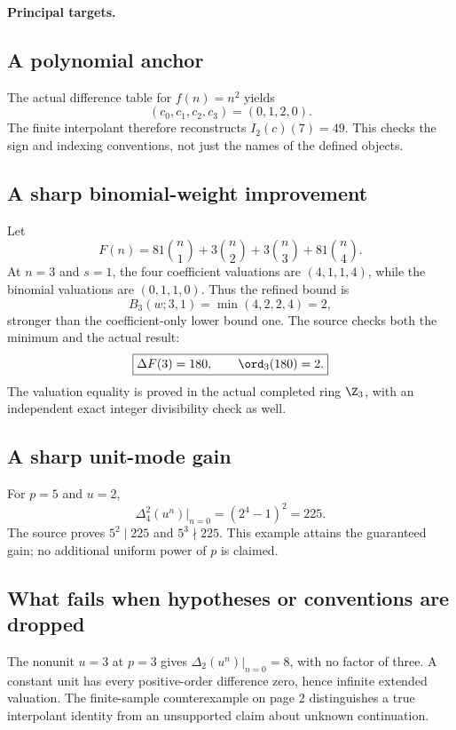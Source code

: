 \textbf{Principal targets.}\par
{}\par
{}\par
{}
\par\medskip
{}
\subsection*{A polynomial anchor}
The actual difference table for $f(n)=n^2$ yields
\[
 (c_0,c_1,c_2,c_3)=(0,1,2,0).
\]
The finite interpolant therefore reconstructs $I_2(c)(7)=49$. This checks the sign and indexing conventions, not just the names of the defined objects.

\subsection*{A sharp binomial-weight improvement}
Let
\[
 F(n)=81\binom n1+3\binom n2+3\binom n3+81\binom n4.
\]
At $n=3$ and $s=1$, the four coefficient valuations are $(4,1,1,4)$, while the binomial valuations are $(0,1,1,0)$. Thus the refined bound is
\[
 B_3(w;3,1)=\min(4,2,2,4)=2,
\]
stronger than the coefficient-only lower bound one. The source checks both the minimum and the actual result:
\[
 \boxed{\Delta F(3)=180,\qquad\ord_3(180)=2.}
\]
The valuation equality is proved in the actual completed ring $\Z_3$, with an independent exact integer divisibility check as well.

\subsection*{A sharp unit-mode gain}
For $p=5$ and $u=2$,
\[
 \Delta_4^2(u^n)\big|_{n=0}=(2^4-1)^2=225.
\]
The source proves $5^2\mid225$ and $5^3\nmid225$. This example attains the guaranteed gain; no additional uniform power of $p$ is claimed.

\subsection*{What fails when hypotheses or conventions are dropped}
The nonunit $u=3$ at $p=3$ gives $\Delta_2(u^n)|_{n=0}=8$, with no factor of three. A constant unit has every positive-order difference zero, hence infinite extended valuation. The finite-sample counterexample on page 2 distinguishes a true interpolant identity from an unsupported claim about unknown continuation.


